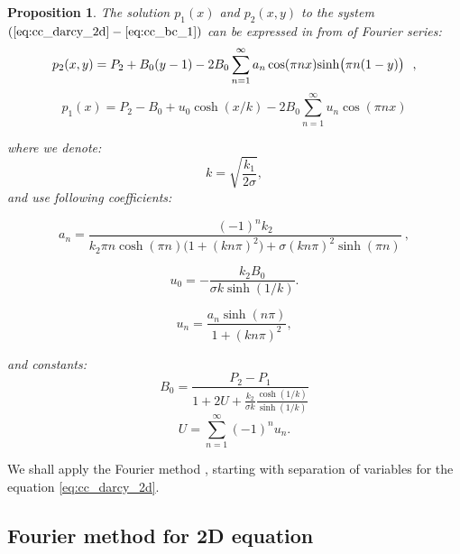\documentclass[a4paper,10pt]{article}
\newtheorem{prop}{Proposition}
\begin{document}
\begin{prop}
\label{proposition_continuous}
The solution $p_1(x)$ and $p_2(x,y)$ to the system $(\ref{eq:cc_darcy_2d} - \ref{eq:cc_bc_1})$
can be expressed in from of Fourier series:
\begin{equation}
    \label{eq:p2_series}
    p_2(x,y) = P_2 + B_0(y-1) -2B_0 \sum_{n=1}^\infty a_n \cos(\pi n x) {\rm sinh} \big(\pi n(1-y)\big)  \ \ ,
\end{equation}
%
\begin{equation}
    \label{eq:p2_series}
    p_1(x) = P_2-B_0 +u_0 \cosh(x/k) -2B_0 \sum_{n=1}^\infty  u_n \cos(\pi n x) 
\end{equation}

where we denote:
\[
    k = \sqrt{\frac{k_1}{2\sigma}}, 
\]    
and use following coefficients:

\begin{equation}
    \label{eq:an}
    a_n = \frac{(-1)^n k_2}{ k_2 \pi n \cosh(\pi n) \big(1 + (k n \pi)^2\big) 
    + \sigma (k n \pi)^2 \sinh(\pi n)} \ , 
\end{equation}

\begin{equation}
    \label{eq:u0}
    u_0 = -\frac{k_2 B_0}{\sigma k\sinh(1/k)}.
\end{equation}

\begin{equation}
    \label{eq:un}
    u_n = \frac{a_n \sinh(n \pi)}{1 + (k n \pi)^2}, 
\end{equation}




and constants:
\begin{equation}
     \label{eq:b0}
     B_0 = \frac{P_2 - P_1}{1 + 2  U + \frac{k_2}{\sigma k} \frac{\cosh(1/k)}{\sinh(1/k)}} 
\end{equation}
\begin{equation}
    \label{eq:U}
    U =  \sum_{n=1}^{\infty} (-1)^n u_n.
\end{equation}

\end{prop}

We shall apply the Fourier method \cite{??}, starting with separation of variables for the equation \eqref{eq:cc_darcy_2d}.  

\subsection{\bf Fourier method for 2D equation}
\label{sec:p2_conductive}
\end{document}
